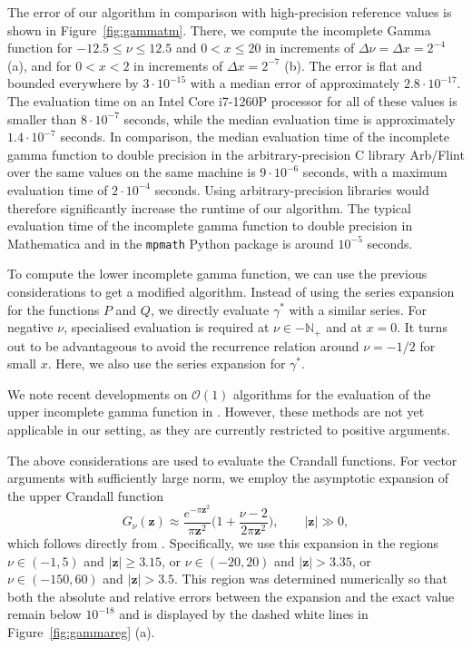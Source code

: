 \documentclass[]{amsart}
\newcommand{\new}[1]{#1}
\numberwithin{mythm}{section}
\begin{document}
\new{
The error of our algorithm in comparison with high-precision reference values is shown in Figure~\ref{fig:gammatm}.
There, we compute the incomplete Gamma function for
$-12.5\le\nu\le12.5$ and $0<x\le 20$ in increments of $\Delta\nu=\Delta x=2^{-4}$ (a), and for $0<x<2$ in increments of $\Delta x=2^{-7}$ (b).
The error is flat and bounded everywhere by $3\cdot 10^{-15}$ with a median error of approximately $2.8\cdot 10^{-17}$.
The evaluation time
on an Intel Core i7-1260P processor for all of these values is smaller than $8\cdot 10^{-7}$ seconds, while the median evaluation time is approximately $1.4\cdot 10^{-7}$ seconds.
In comparison, the median evaluation time of the incomplete gamma function to double precision in the arbitrary-precision C library Arb/Flint \cite{arb} over the same values on the same machine is $9\cdot 10^{-6}$ seconds, with a maximum evaluation time of $2\cdot 10^{-4}$ seconds. Using arbitrary-precision libraries would therefore significantly increase the runtime of our algorithm.
The typical evaluation time of the incomplete gamma function to double precision in Mathematica and in the \texttt{mpmath} Python package is around $10^{-5}$ seconds.
}

To compute the lower incomplete gamma function, we can use the previous considerations to get a modified algorithm. Instead of using the series expansion for the functions $P$ and $Q$, we directly evaluate $\gamma^*$ with a similar series. For negative $\nu$, specialised evaluation is required at $\nu \in -\mathds{N}_+$ and at $x=0$. It turns out to be advantageous to avoid the recurrence relation around $\nu = -1/2$ for small $x$. Here, we also use the series expansion for $\gamma^*$.

\new{We note recent developments on $\mathcal O(1)$ algorithms for the evaluation of the upper incomplete gamma function in \cite{greengard2019algorithm}. However, these methods are not yet applicable in our setting, as they are currently restricted to positive arguments.}

\new{
The above considerations are used to evaluate the Crandall functions. For vector arguments  with sufficiently large norm, we employ the asymptotic expansion of the upper Crandall function
$$
G_{\nu}(\bm z)\approx
\frac{e^{-\pi \bm z^2}}{\pi \bm z^2}
\Big(
1+\frac{\nu-2}{2\pi\bm z^2}
\Big)
,\qquad |\bm z|\gg 0,
$$
which follows directly from \cite[6.5.32]{abramowitz}. Specifically, we use this expansion in the regions $\nu\in (-1,5)$ and $|\bm z|\ge 3.15$, or $\nu\in (-20,20)$ and $|\bm z|>3.35$, or $\nu\in(-150,60)$ and $|\bm z|>3.5$. This region was determined numerically so that both the absolute and relative errors between the expansion and the exact value remain below $10^{-18}$ and is displayed by the dashed white lines in Figure~\ref{fig:gammareg} (a).
}
\end{document}
